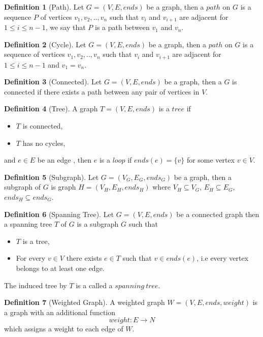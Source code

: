 \documentclass{report}
\theoremstyle{plain}
\theoremstyle{definition}
\newtheorem{definition}{Definition}
\theoremstyle{remark}
\begin{document}
\begin{definition}[Path]
Let $G = (V, E, ends)$ be a graph, then a $path$ on $G$ is a sequence $P$ of vertices $v_1,v_2,..,v_n$ such that $v_i$ and $v_{i+1}$ are adjacent for $1 \leq i \leq n - 1$, we say that $P$ is a path between $v_1$ and $v_n$.
\end{definition}

\begin{definition}[Cycle]
Let $G = (V, E, ends)$ be a graph, then a $path$ on $G$ is a sequence of vertices $v_1,v_2,..,v_n$ such that $v_i$ and $v_{i+1}$ are adjacent for $1 \leq i \leq n - 1$ and $v_1=v_n$.
\end{definition}

\begin{definition}[Connected]
Let $G = (V, E, ends)$ be a graph, then a $G$ is connected if there exists a path between any pair of vertices in $V$.
\end{definition}

\begin{definition}[Tree]
A graph $T = (V, E, ends)$ is a $tree$ if
\begin{itemize}
\item $T$ is connected,
\item $T$ has no cycles,
\end{itemize}
and $e \in E$ be an edge , then $e$ is a $loop$ if $ends(e) = \{v\}$ for some vertex $v \in V$.
\end{definition}

\begin{definition}[Subgraph]
Let $G = (V_G, E_G, ends_G)$ be a graph, then a subgraph of $G$ is graph $H = (V_H, E_H, ends_H)$ where $V_H \subseteq V_G$, $E_H \subseteq E_G$, $ends_H \subseteq ends_G$.
\end{definition}

\begin{definition}[Spanning Tree]
Let $G = (V, E, ends)$ be a connected graph then a spanning tree $T$ of $G$ is a subgraph $G$ such that
\begin{itemize}
\item $T$ is a tree,
\item For every $v \in V$ there exists $e \in T$ such that $v \in ends(e)$, i.e every vertex belongs to at least one edge.
\end{itemize}
The induced tree by $T$ is a called a $spanning \  tree$.
\end{definition}

\begin{definition}[Weighted Graph]
A weighted graph $W = (V, E, ends, weight)$ is a graph with an additional function
  \begin{equation}
  weight:E\to N
  \end{equation}
which assigns a weight to each edge of $W$.
\end{definition}
\end{document}
